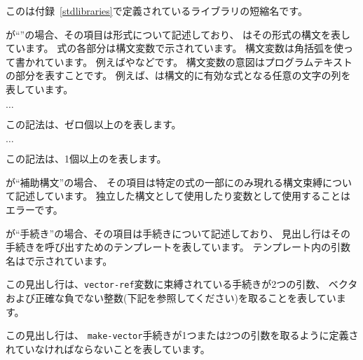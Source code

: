 このは付録~\ref{stdlibraries}で定義されているライブラリの短縮名です。

が``\exprtype''の場合、その項目は形式について記述しており、
はその形式の構文を表しています。
式の各部分は構文変数で示されています。
構文変数は角括弧を使って書かれています。
例えばやなどです。
構文変数の意図はプログラムテキストの部分を表すことです。
例えば、は構文的に有効な式となる任意の文字の列を表しています。
\begin{tabbing}
\qquad {} $\ldots$
\end{tabbing}
この記法は、ゼロ個以上のを表します。
\begin{tabbing}
\qquad {}  $\ldots$
\end{tabbing}
この記法は、1個以上のを表します。

が``補助構文''の場合、
その項目は特定の式の一部にのみ現れる構文束縛について記述しています。
独立した構文として使用したり変数として使用することはエラーです。

が``手続き''の場合、その項目は手続きについて記述しており、
見出し行はその手続きを呼び出すためのテンプレートを表しています。
テンプレート内の引数名はで示されています。

\noindent{}\unpenalty

この見出し行は、{\tt vector-ref}変数に束縛されている手続きが2つの引数、
ベクタおよび正確な負でない整数(下記を参照してください)を取ることを表しています。

\noindent%
\unpenalty

この見出し行は、
{\tt make-vector}手続きが1つまたは2つの引数を取るように定義されていなければならないことを表しています。

